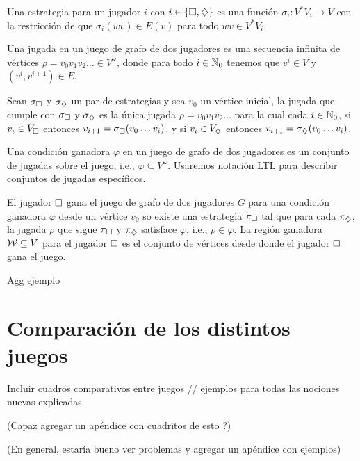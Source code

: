 \begin{definition}
	Una estrategia para un jugador $i$ con $i \in \{\square, \diamondsuit\}$ es una función $\sigma_i: V^*V_i \rightarrow V$ con la restricción de que $\sigma_i(wv) \in E(v)$ para todo $wv \in V^*V_i$.
\end{definition}

\begin{definition}
	Una jugada en un juego de grafo de dos jugadores es una secuencia infinita de vértices $\rho = v_0v_1v_2 \dots \in V^\omega$, donde para todo $i \in \mathbb{N}_0$ tenemos que $v^i \in V$ y $(v^i, v^{i+1}) \in E$.

	Sean $\sigma_\square$ y $\sigma_\diamondsuit$ un par de estrategias y sea $v_0$ un
	vértice inicial, la jugada que cumple con $\sigma_\square$ y $\sigma_\diamondsuit$ es la
	única jugada $\rho = v_0 v_1 v_2 \dots$ para la cual cada $i \in \mathbb{N}_0$, si $v_i
		\in V_\square$ entonces $v_{i+1} = \sigma_\square(v_0 \dots v_i)$, y si $v_i \in
		V_\diamondsuit$ entonces $v_{i+1} = \sigma_\diamondsuit(v_0 \dots v_i)$.
\end{definition}

\begin{definition}
	Una condición ganadora $\varphi$ en un juego de grafo de dos jugadores es un conjunto de jugadas sobre el juego, i.e., $\varphi \subseteq V^\omega$. Usaremos notación LTL para describir conjuntos de jugadas específicos.
\end{definition}

\begin{definition}
	El jugador $\square$ gana el juego de grafo de dos jugadores $G$ para una condición ganadora $\varphi$ desde un vértice $v_0$ so existe una estrategia $\pi_\square$ tal que para cada $\pi_\diamondsuit$, la jugada $\rho$ que sigue $\pi_\square$ y $\pi_\diamondsuit$ satisface $\varphi$, i.e., $\rho \in \varphi$.
	La región ganadora $\mathcal{W} \subseteq V$ para el jugador $\square$ es el conjunto de vértices desde donde el jugador $\square$ gana el juego.
\end{definition}

Agg ejemplo

\section{Comparación de los distintos juegos}

Incluir cuadros comparativos entre juegos // ejemplos para todas las nociones
nuevas explicadas

(Capaz agregar un apéndice con cuadritos de esto ?)

(En general, estaría bueno ver problemas y agregar un apéndice con ejemplos)